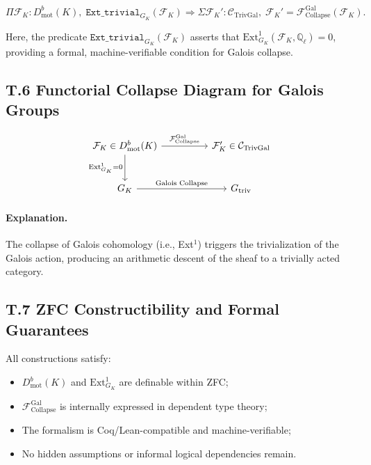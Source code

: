 \documentclass[11pt]{article}
\begin{document}
\[
\Pi \mathcal{F}_K : D^b_{\mathrm{mot}}(K),\;
\texttt{Ext\_trivial}_{G_K}(\mathcal{F}_K)
\Rightarrow
\Sigma \mathcal{F}_K' : \mathcal{C}_{\mathrm{TrivGal}},\;
\mathcal{F}_K' = \mathcal{F}_{\mathrm{Collapse}}^{\mathrm{Gal}}(\mathcal{F}_K).
\]

Here, the predicate $\texttt{Ext\_trivial}_{G_K}(\mathcal{F}_K)$ asserts that $\mathrm{Ext}^1_{G_K}(\mathcal{F}_K, \mathbb{Q}_\ell) = 0$, providing a formal, machine-verifiable condition for Galois collapse.

\subsection*{T.6 Functorial Collapse Diagram for Galois Groups}

\[
\begin{tikzcd}[column sep=huge, row sep=large]
\mathcal{F}_K \in D^b_{\mathrm{mot}}(K) \arrow[r, "{\mathcal{F}_{\mathrm{Collapse}}^{\mathrm{Gal}}}"] \arrow[d, swap, "{\mathrm{Ext}^1_{G_K} = 0}"]
& \mathcal{F}_K' \in \mathcal{C}_{\mathrm{TrivGal}} \\
G_K \arrow[r, "{\text{Galois Collapse}}"]
& G_{\mathrm{triv}}
\end{tikzcd}
\]

\paragraph{Explanation.} The collapse of Galois cohomology (i.e., Ext$^1$) triggers the trivialization of the Galois action, producing an arithmetic descent of the sheaf to a trivially acted category.

\subsection*{T.7 ZFC Constructibility and Formal Guarantees}

All constructions satisfy:
\begin{itemize}
    \item $D^b_{\mathrm{mot}}(K)$ and $\mathrm{Ext}^1_{G_K}$ are definable within ZFC;
    \item $\mathcal{F}_{\mathrm{Collapse}}^{\mathrm{Gal}}$ is internally expressed in dependent type theory;
    \item The formalism is Coq/Lean-compatible and machine-verifiable;
    \item No hidden assumptions or informal logical dependencies remain.
\end{itemize}
\end{document}
